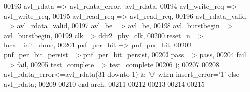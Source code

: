 \begin{DoxyCode}
00193         avl\_rdata               => avl_rdata_error,\textcolor{keyword}{--avl\_rdata,}
00194         avl\_write\_req           => avl_write_req,
00195         avl\_read\_req            => avl_read_req,
00196         avl\_rdata\_valid     => avl_rdata_valid,
00197         avl\_be                  => avl_be,
00198         avl\_burstbegin          => avl_burstbegin,
00199         clk                     => ddr2_phy_clk,
00200         reset\_n                 => local_init_done,
00201         pnf\_per\_bit             => pnf_per_bit,
00202         pnf\_per\_bit\_persist => pnf_per_bit_persist,
00203         pass                        => pass,
00204         fail                        => fail,
00205         test\_complete           => test_complete 
00206     \textcolor{vhdlchar}{)};  
00207     
00208     \textcolor{vhdlchar}{avl_rdata_error}\textcolor{vhdlchar}{<=}\textcolor{vhdlchar}{avl_rdata}\textcolor{vhdlchar}{(}\textcolor{vhdllogic}{}\textcolor{vhdllogic}{31} \textcolor{keywordflow}{downto} \textcolor{vhdllogic}{}\textcolor{vhdllogic}{1}\textcolor{vhdlchar}{)} \textcolor{vhdlchar}{&} \textcolor{vhdlchar}{'}\textcolor{vhdllogic}{}\textcolor{vhdllogic}{0}\textcolor{vhdlchar}{'} \textcolor{keywordflow}{when} \textcolor{vhdlchar}{insert_error}\textcolor{vhdlchar}{=}\textcolor{vhdlchar}{'}\textcolor{vhdllogic}{}\textcolor{vhdllogic}{1}\textcolor{vhdlchar}{'} \textcolor{keywordflow}{else} \textcolor{vhdlchar}{
      avl_rdata};
00209   
00210 \textcolor{keywordflow}{end} \textcolor{vhdlchar}{arch};
00211 
00212 
00213 
00214 
00215 
\end{DoxyCode}

